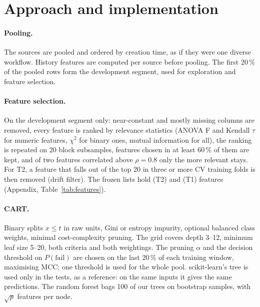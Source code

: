 \documentclass[11pt,a4paper]{article}
\newcommand{\tab}[1]{\resizebox{\ifdim\width>\linewidth\linewidth\else\width\fi}{!}{}}
\begin{document}
\begin{table}[H]
\centering\small
\tab{sources}
\caption{Sources. \emph{runs}: collected (all events); \emph{kept}: runs with a
pass or fail label; \emph{infra dropped}: infrastructure failures removed. Names
carry the workflow id when a repository has two workflows.}
\label{tab:sources}
\end{table}

\section{Approach and implementation}

\paragraph{Pooling.} The \NSources{} sources are pooled and ordered by creation
time, as if they were one diverse workflow. History features are computed per
source before pooling. The first 20\,\% of the pooled rows form the development
segment, used for exploration and feature selection.

\paragraph{Feature selection.} On the development segment only: near-constant and
mostly missing columns are removed, every feature is ranked by relevance statistics
(ANOVA F and Kendall $\tau$ for numeric features, $\chi^2$ for binary ones, mutual
information for all), the ranking is
repeated on 20 block subsamples, features chosen in at least 60\,\% of them are
kept, and of two features correlated above $\rho = 0.8$ only the more relevant
stays. For T2, a feature that falls out of the top 20 in three or more CV training
folds is then removed (drift filter). The frozen lists hold \NFeatTwo{} (T2) and
\NFeatOne{} (T1) features (Appendix, Table~\ref{tab:features}).

\paragraph{CART.} Binary splits $x \le t$ in raw units, Gini or entropy impurity,
optional balanced class weights, minimal cost-complexity pruning. The grid covers
depth 3--12, minimum leaf size 5--20, both criteria and both weightings. The
pruning $\alpha$ and the decision threshold on $P(\text{fail})$ are chosen on the
last 20\,\% of each training window, maximising MCC; one threshold is used for the
whole pool. scikit-learn's tree is used only in the tests, as a reference: on the
same inputs it gives the same predictions. The random forest bags 100 of our trees
on bootstrap samples, with $\sqrt{p}$ features per node.
\end{document}
